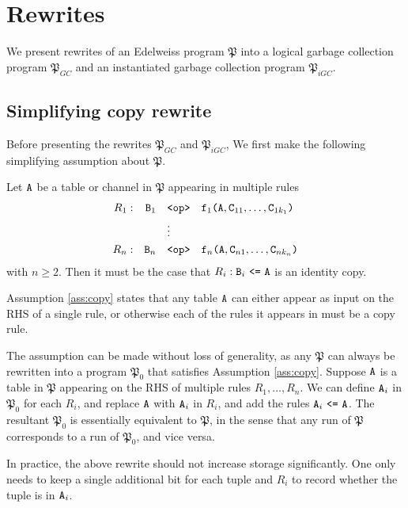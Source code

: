 
\section{Rewrites}
\label{sec:rewrites}

We present rewrites of an Edelweiss program $\mathfrak{P}$ into a logical garbage collection program $\mathfrak{P}_{GC}$ and an instantiated garbage collection program $\mathfrak{P}_{iGC}$.

\setcounter{subsection}{-1}
\subsection{Simplifying copy rewrite}
Before presenting the rewrites $\mathfrak{P}_{GC}$ and $\mathfrak{P}_{iGC}$, We first make the following simplifying assumption about $\mathfrak{P}$.
\begin{assumption}
\label{ass:copy}
Let $\tt{A}$ be a table or channel in $\mathfrak{P}$ appearing in multiple rules
\begin{align*}
R_1: && \tt{B}_1 &\quad\tt{<op>}\quad \tt{f}_1\tt{(}\tt{A},\tt{C}_{11},\dots,\tt{C}_{1k_1}\tt{)}\\
&&&\quad\vdots\\
R_n: && \tt{B}_n &\quad\tt{<op>}\quad \tt{f}_n\tt{(}\tt{A},\tt{C}_{n1},\dots,\tt{C}_{nk_n}\tt{)}
\end{align*}
with $n \geq 2$.
Then it must be the case that $R_i: \tt{B}_i ~\tt{<=}~ \tt{A}$ is an identity copy.
\end{assumption}
Assumption \ref{ass:copy} states that any table $\tt{A}$ can either appear as input on the RHS of a single rule, or otherwise each of the rules it appears in must be a copy rule.

The assumption can be made without loss of generality, as any $\mathfrak{P}$ can always be rewritten into a program $\mathfrak{P}_0$ that satisfies Assumption \ref{ass:copy}.
Suppose $\tt{A}$ is a table in $\mathfrak{P}$ appearing on the RHS of multiple rules $R_1,\dots,R_n$.
We can define $\tt{A}_i$ in $\mathfrak{P}_0$ for each $R_i$, and replace $\tt{A}$ with $\tt{A}_i$ in $R_i$, and add the rules $\tt{A}_i ~\tt{<=}~ \tt{A}$.
The resultant $\mathfrak{P}_0$ is essentially equivalent to $\mathfrak{P}$, in the sense that any run of $\mathfrak{P}$ corresponds to a run of $\mathfrak{P}_0$, and vice versa.

In practice, the above rewrite should not increase storage significantly.
One only needs to keep a single additional bit for each tuple and $R_i$ to record whether the tuple is in $\tt{A}_i$.

